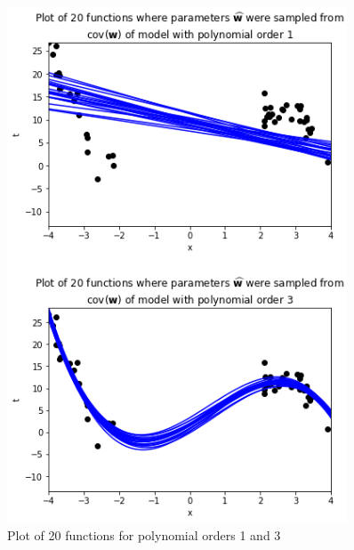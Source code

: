 \documentclass[10pt]{article}
\begin{document}
\begin{itemize}
\begin{figure}
\centering
\includegraphics[width=0.9\textwidth]{5d.png}
\caption{\label{fig:5}Plot of 20 functions for polynomial orders 1 and 3}
\end{figure}


\end{itemize}
\end{document}
